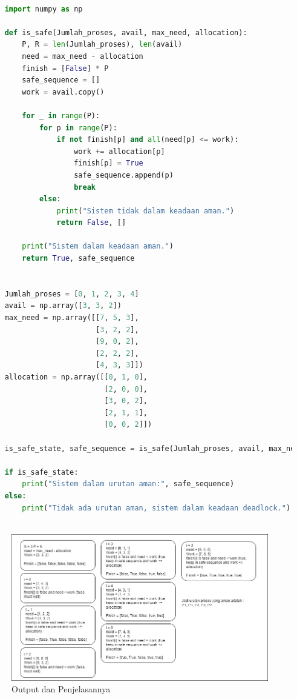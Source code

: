 \documentclass[12pt]{article}
\begin{document}
\begin{lstlisting}[language=Python]

    import numpy as np
    
    def is_safe(Jumlah_proses, avail, max_need, allocation):
        P, R = len(Jumlah_proses), len(avail) 
        need = max_need - allocation 
        finish = [False] * P 
        safe_sequence = []  
        work = avail.copy() 
    
        for _ in range(P):
            for p in range(P):
                if not finish[p] and all(need[p] <= work): 
                    work += allocation[p]
                    finish[p] = True
                    safe_sequence.append(p)
                    break
            else:
                print("Sistem tidak dalam keadaan aman.")
                return False, []
    
        print("Sistem dalam keadaan aman.")
        return True, safe_sequence
    
    
    Jumlah_proses = [0, 1, 2, 3, 4]
    avail = np.array([3, 3, 2]) 
    max_need = np.array([[7, 5, 3],
                         [3, 2, 2],
                         [9, 0, 2],
                         [2, 2, 2],
                         [4, 3, 3]]) 
    allocation = np.array([[0, 1, 0],
                           [2, 0, 0],
                           [3, 0, 2],
                           [2, 1, 1],
                           [0, 0, 2]]) 
    
    is_safe_state, safe_sequence = is_safe(Jumlah_proses, avail, max_need, allocation)
    
    if is_safe_state:
        print("Sistem dalam urutan aman:", safe_sequence)
    else:
        print("Tidak ada urutan aman, sistem dalam keadaan deadlock.")
    
\end{lstlisting}

\begin{figure}[H]
    \centering
    \includegraphics[width=1\linewidth]{asset/421.png}
    \caption{Output dan Penjelasannya}
\end{figure}
\end{document}
